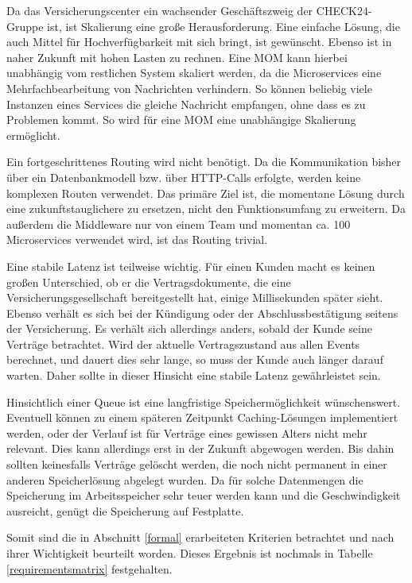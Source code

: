 Da das Versicherungscenter ein wachsender Geschäftszweig der CHECK24-Gruppe ist,
ist Skalierung eine große Herausforderung. Eine einfache Lösung, die auch Mittel für
Hochverfügbarkeit mit sich bringt, ist gewünscht. Ebenso ist in naher Zukunft
mit hohen Lasten zu rechnen. Eine MOM kann hierbei unabhängig vom restlichen
System skaliert werden, da die Microservices eine Mehrfachbearbeitung von
Nachrichten verhindern. So können beliebig viele Instanzen eines Services die
gleiche Nachricht empfangen, ohne dass es zu Problemen kommt.
So wird für eine MOM eine unabhängige Skalierung ermöglicht.

Ein fortgeschrittenes Routing wird nicht benötigt. Da die Kommunikation 
bisher über ein Datenbankmodell bzw. über HTTP-Calls erfolgte, werden keine
komplexen Routen verwendet. Das primäre Ziel ist, die momentane Lösung durch eine
zukunftstauglichere zu ersetzen, nicht den Funktionsumfang zu erweitern. Da
außerdem die Middleware nur von einem Team und momentan ca. 100 Microservices
verwendet wird, ist das Routing trivial.

Eine stabile Latenz ist teilweise wichtig.
Für einen Kunden macht es keinen großen Unterschied, ob er die Vertragsdokumente,
die eine Versicherungsgesellschaft bereitgestellt hat, einige Millisekunden
später sieht. Ebenso verhält es sich bei der Kündigung oder der
Abschlussbestätigung seitens der Versicherung.
Es verhält sich allerdings anders, sobald der Kunde seine Verträge betrachtet.
Wird der aktuelle Vertragszustand aus allen Events berechnet, und dauert dies
sehr lange, so muss der Kunde auch länger darauf warten. Daher sollte in dieser
Hinsicht eine stabile Latenz gewährleistet sein.

Hinsichtlich einer Queue ist eine langfristige Speichermöglichkeit
wünschenswert. Eventuell können zu einem späteren Zeitpunkt Caching-Lösungen
implementiert werden, oder der Verlauf ist für Verträge eines gewissen Alters
nicht mehr relevant. Dies kann allerdings erst in der Zukunft abgewogen werden.
Bis dahin sollten keinesfalls Verträge gelöscht werden, die noch nicht permanent
in einer anderen Speicherlösung abgelegt wurden.
Da für solche Datenmengen die Speicherung im Arbeitsspeicher sehr teuer werden
kann und die Geschwindigkeit ausreicht, genügt die Speicherung auf Festplatte.

Somit sind die in Abschnitt \ref{formal} erarbeiteten
Kriterien betrachtet und nach ihrer Wichtigkeit beurteilt worden. Dieses Ergebnis
ist nochmals in Tabelle \ref{requirementsmatrix} festgehalten.

